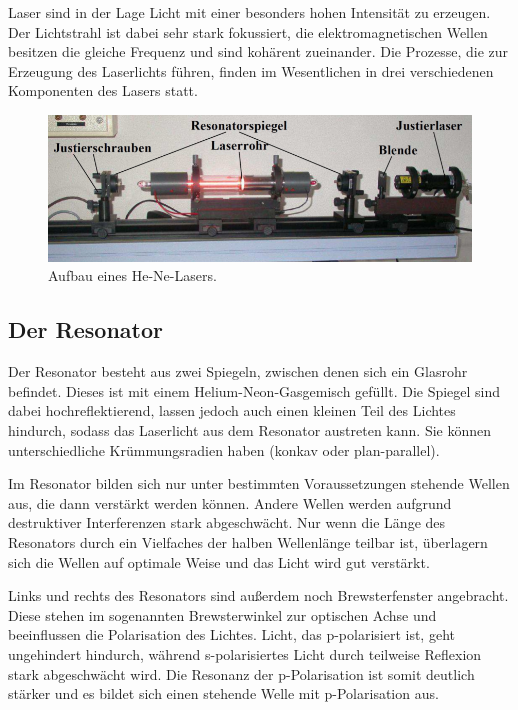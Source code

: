 Laser sind in der Lage Licht mit einer besonders hohen Intensität zu erzeugen. Der Lichtstrahl ist dabei sehr stark fokussiert,
die elektromagnetischen Wellen besitzen die gleiche Frequenz und sind kohärent zueinander. Die Prozesse, die zur
Erzeugung des Laserlichts führen, finden im Wesentlichen in drei verschiedenen Komponenten des Lasers statt.

\begin{figure}
\centering
\includegraphics[width=\textwidth]{laseraufbau.png}
\caption{Aufbau eines He-Ne-Lasers.\cite[3]{anleitung}}
\label{fig:laseraufbau}
\end{figure}

\subsection{Der Resonator}

Der Resonator besteht aus zwei Spiegeln, zwischen denen sich ein Glasrohr befindet. Dieses ist mit einem Helium-Neon-Gasgemisch
gefüllt. Die Spiegel sind dabei hochreflektierend, lassen jedoch auch einen kleinen Teil des Lichtes hindurch, sodass das
Laserlicht aus dem Resonator austreten kann. Sie können unterschiedliche Krümmungsradien haben (konkav oder plan-parallel).

Im Resonator bilden sich nur unter bestimmten Voraussetzungen stehende Wellen aus, die dann verstärkt werden können.
Andere Wellen werden aufgrund destruktiver Interferenzen stark abgeschwächt. Nur wenn die Länge des Resonators durch ein
Vielfaches der halben Wellenlänge teilbar ist, überlagern sich die Wellen auf optimale Weise und das Licht wird gut verstärkt.

Links und rechts des Resonators sind außerdem noch Brewsterfenster angebracht. Diese stehen im sogenannten Brewsterwinkel
zur optischen Achse und beeinflussen die Polarisation des Lichtes. Licht, das p-polarisiert ist,
geht ungehindert hindurch, während s-polarisiertes Licht durch teilweise Reflexion stark abgeschwächt wird.
Die Resonanz der p-Polarisation ist somit deutlich stärker und es bildet sich einen stehende Welle mit p-Polarisation aus.

